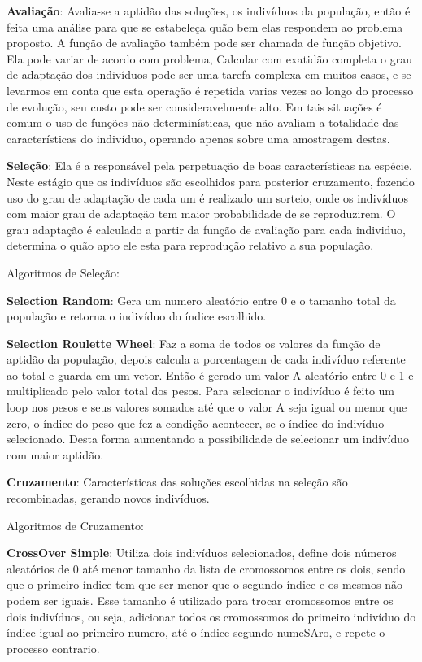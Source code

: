 \textbf{Avaliação}: Avalia-se a aptidão das soluções, os indivíduos da população, então é feita uma análise para que se estabeleça quão bem elas respondem ao problema proposto.
A função de avaliação também pode ser chamada de função objetivo. Ela pode variar de acordo com problema,  
Calcular com exatidão completa o grau de adaptação dos indivíduos pode ser uma tarefa complexa em muitos casos, e se levarmos em conta que esta operação é repetida varias vezes ao longo do processo de evolução, seu custo pode ser consideravelmente alto. Em tais situações é comum o uso de funções não determinísticas, que não avaliam a totalidade das características do indivíduo, operando apenas sobre uma amostragem destas.

\textbf{Seleção}: Ela é a responsável pela perpetuação de boas características na espécie. 
Neste estágio que os indivíduos são escolhidos para posterior cruzamento, fazendo uso do grau de adaptação de cada um é realizado um sorteio, onde os indivíduos com maior grau de adaptação tem maior probabilidade de se reproduzirem.
O grau adaptação é calculado a partir da função de avaliação para cada individuo, determina o quão apto ele esta para reprodução relativo a sua população. 

Algoritmos de Seleção:

\textbf{Selection Random}: Gera um numero aleatório entre 0 e o tamanho total da população e retorna o indivíduo do índice escolhido.

\textbf{Selection Roulette Wheel}: Faz a soma de todos os valores da função de aptidão da população, depois calcula a porcentagem de cada indivíduo referente ao total 
e guarda em um vetor. Então é gerado um valor A aleatório entre 0 e 1 e multiplicado pelo valor total dos pesos. Para selecionar o indivíduo é feito um loop 
nos pesos e seus valores somados até que o valor A seja igual ou menor que zero, o índice do peso que fez a condição acontecer, se o índice do indivíduo selecionado.
Desta forma aumentando a possibilidade de selecionar um indivíduo com maior aptidão.


\textbf{Cruzamento}: Características das soluções escolhidas na seleção são recombinadas, gerando novos indivíduos.

Algoritmos de Cruzamento:

\textbf{CrossOver Simple}: Utiliza dois indivíduos selecionados,  define dois números aleatórios de 0 até menor tamanho da lista de cromossomos entre os dois, 
sendo que o primeiro índice tem que ser menor que o segundo índice e os mesmos não podem ser iguais. 
Esse tamanho é utilizado para trocar cromossomos entre os dois indivíduos, ou seja, adicionar todos os cromossomos do primeiro indivíduo do índice 
igual ao primeiro numero, até o índice segundo numeSAro, e repete o processo contrario.

